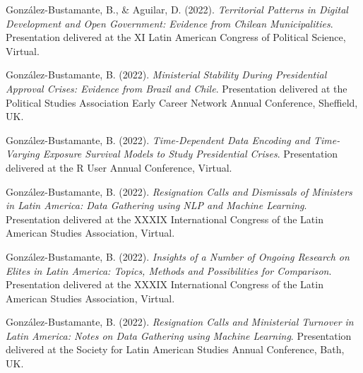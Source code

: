 \begin{publications}

\begin{benumerate}{71}

\item{\small González-Bustamante, B., \& Aguilar, D. (2022). {\itshape Territorial Patterns in Digital Development and Open Government: Evidence from Chilean Municipalities}. Presentation delivered at the XI Latin American Congress of Political Science, Virtual.}\vspace{1mm}

\item{\small González-Bustamante, B. (2022). {\itshape Ministerial Stability During Presidential Approval Crises: Evidence from Brazil and Chile}. Presentation delivered at the Political Studies Association Early Career Network Annual Conference, Sheffield, UK.}\vspace{1mm}

\item{\small González-Bustamante, B. (2022). {\itshape Time-Dependent Data Encoding and Time-Varying Exposure Survival Models to Study Presidential Crises}. Presentation delivered at the R User Annual Conference, Virtual.}\vspace{1mm}


\item{\small González-Bustamante, B. (2022). {\itshape Resignation Calls and Dismissals of Ministers in Latin America: Data Gathering using NLP and Machine Learning}. Presentation delivered at the XXXIX International Congress of the Latin American Studies Association, Virtual.}\vspace{1mm}

\item{\small González-Bustamante, B. (2022). {\itshape Insights of a Number of Ongoing Research on Elites in Latin America: Topics, Methods and Possibilities for Comparison}. Presentation delivered at the XXXIX International Congress of the Latin American Studies Association, Virtual.}\vspace{1mm}

\item{\small González-Bustamante, B. (2022). {\itshape Resignation Calls and Ministerial Turnover in Latin America: Notes on Data Gathering using Machine Learning}. Presentation delivered at the Society for Latin American Studies Annual Conference, Bath, UK.}\vspace{1mm}


\end{benumerate}
\end{publications}
